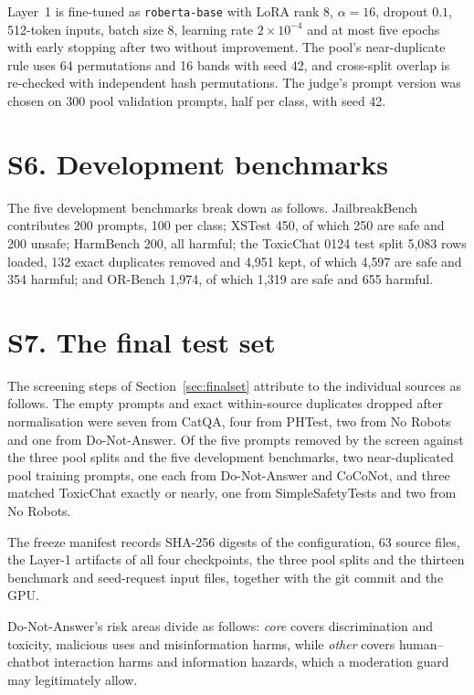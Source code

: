 \documentclass[journal]{IEEEtran}
\begin{document}
Layer~1 is fine-tuned as \texttt{roberta-base} with LoRA rank $8$,
$\alpha=16$, dropout $0.1$, 512-token inputs, batch size 8, learning rate
$2\times10^{-4}$ and at most five epochs with early stopping after two without
improvement. The pool's near-duplicate rule uses 64 permutations and 16 bands
with seed 42, and cross-split overlap is re-checked with independent hash
permutations. The judge's prompt version was chosen on 300 pool validation
prompts, half per class, with seed 42.

\section*{S6. Development benchmarks}

The five development benchmarks break down as follows. JailbreakBench
contributes 200 prompts, 100 per class; XSTest 450, of which 250 are safe and
200 unsafe; HarmBench 200, all harmful; the ToxicChat 0124 test split 5{,}083
rows loaded, 132 exact duplicates removed and 4{,}951 kept, of which 4{,}597
are safe and 354 harmful; and OR-Bench 1{,}974, of which 1{,}319 are safe and
655 harmful.

\section*{S7. The final test set}

The screening steps of Section~\ref{sec:finalset} attribute to the individual
sources as follows. The empty prompts and exact within-source duplicates
dropped after normalisation were seven from CatQA, four from PHTest, two from
No Robots and one from Do-Not-Answer. Of the five prompts removed by the screen
against the three pool splits and the five development benchmarks, two
near-duplicated pool training prompts, one each from Do-Not-Answer and CoCoNot,
and three matched ToxicChat exactly or nearly, one from SimpleSafetyTests and
two from No Robots.

The freeze manifest records SHA-256 digests of the configuration, 63 source
files, the Layer-1 artifacts of all four checkpoints, the three pool splits and
the thirteen benchmark and seed-request input files, together with the git
commit and the GPU.

Do-Not-Answer's risk areas divide as follows: \emph{core} covers discrimination
and toxicity, malicious uses and misinformation harms, while \emph{other}
covers human--chatbot interaction harms and information hazards, which a
moderation guard may legitimately allow.
\end{document}
